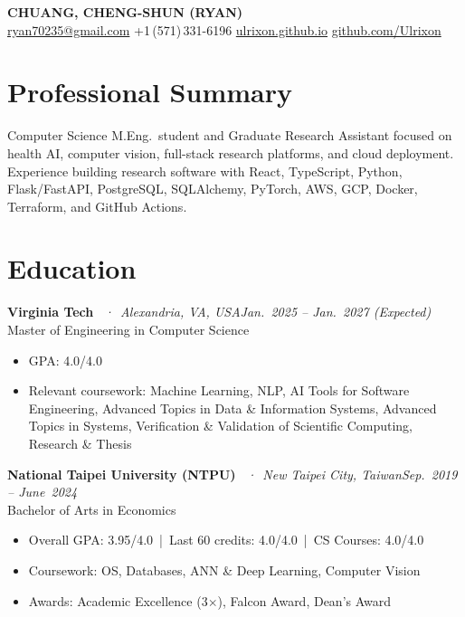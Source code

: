 \documentclass[10pt,letterpaper]{article}
\newcommand{\resumeItem}[1]{\item\small #1}
\newcommand{\entryHeader}[4]{%
  \noindent\textbf{#1} \textit{\small\color{muted}#2}\hfill \textit{\small\color{muted}#3}\\
  {\small #4}
  \vspace{1pt}
}
\begin{document}
\begin{center}
  {\LARGE\bfseries CHUANG, CHENG-SHUN (RYAN)}\\[5pt]
  \small
  \href{mailto:ryan70235@gmail.com}{ryan70235@gmail.com}
  \enspace\textbullet\enspace
  +1\,(571)\,331-6196
  \enspace\textbullet\enspace
  \href{https://ulrixon.github.io}{ulrixon.github.io}
  \enspace\textbullet\enspace
  \href{https://github.com/Ulrixon}{github.com/Ulrixon}
\end{center}
\vspace{2pt}

\section{Professional Summary}

{\small Computer Science M.Eng.\ student and Graduate Research Assistant focused on health AI, computer vision, full-stack research platforms, and cloud deployment. Experience building research software with React, TypeScript, Python, Flask/FastAPI, PostgreSQL, SQLAlchemy, PyTorch, AWS, GCP, Docker, Terraform, and GitHub Actions.}
\vspace{1pt}

\section{Education}

\entryHeader{Virginia Tech}{\ ·\ Alexandria, VA, USA}
            {Jan.~2025 -- Jan.~2027 (Expected)}
            {Master of Engineering in Computer Science}
\begin{itemize}[leftmargin=1.5em, itemsep=0pt, topsep=1pt]
  \resumeItem{GPA: 4.0/4.0}
  \resumeItem{Relevant coursework: Machine Learning, NLP, AI Tools for Software Engineering, Advanced Topics in Data \& Information Systems, Advanced Topics in Systems, Verification \& Validation of Scientific Computing, Research \& Thesis}
\end{itemize}
\vspace{1pt}

\entryHeader{National Taipei University (NTPU)}{\ ·\ New Taipei City, Taiwan}
            {Sep.~2019 -- June~2024}
            {Bachelor of Arts in Economics}
\begin{itemize}[leftmargin=1.5em, itemsep=0pt, topsep=1pt]
  \resumeItem{Overall GPA: 3.95/4.0 \,|\, Last 60 credits: 4.0/4.0 \,|\, CS Courses: 4.0/4.0}
  \resumeItem{Coursework: OS, Databases, ANN \& Deep Learning, Computer Vision}
  \resumeItem{Awards: Academic Excellence (3$\times$), Falcon Award, Dean's Award}
\end{itemize}
\end{document}
